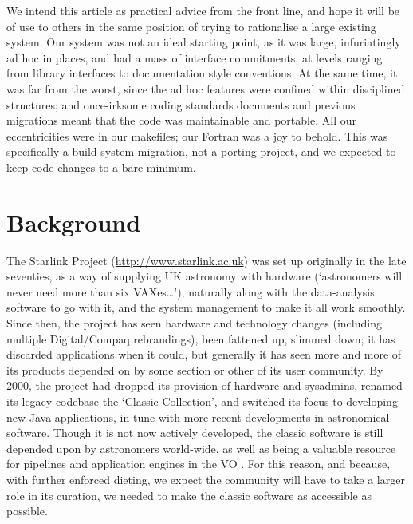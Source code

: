 \documentclass{speauth}
\begin{document}
We intend this article as practical advice from the front line, and
hope it will be of use to others in the same position of trying to
rationalise a large existing system.  Our system was not an ideal
starting point, as it was large, infuriatingly ad hoc in places, and
had a mass of interface commitments, at levels ranging from library
interfaces to documentation style conventions.  At the same time, it
was far from the worst, since the ad hoc features were confined within
disciplined structures; and once-irksome coding standards documents and
previous migrations meant that the code was maintainable and
portable.  All our eccentricities were in our makefiles; our Fortran
was a joy to behold.  This was specifically a build-system migration, not a
porting project, and we expected to keep code changes to a bare minimum.


\section{Background}
\label{s:background}


The Starlink Project (\url{http://www.starlink.ac.uk}) was set up
originally in the late seventies, as a way of supplying UK astronomy
with hardware (`astronomers will never need more than six
VAXes\dots'), naturally along with the data-analysis software to go
with it, and the system management to make it all work smoothly.
Since then, the project has seen hardware and technology changes
(including multiple Digital/Compaq rebrandings), been fattened up,
slimmed down; it has discarded applications when it could, but
generally it has seen more and more of its products depended on by
some section or other of its user community.  By 2000, the project had
dropped its provision of hardware and sysadmins, renamed its legacy
codebase the `Classic Collection', and switched its focus to
developing new Java applications, in tune with more recent
developments in astronomical software.  Though it is not now actively
developed, the classic software is still depended upon by astronomers
world-wide, as well as being a valuable resource for pipelines
\cite{cavanagh03,currie04} and application engines in the VO
\cite{giaretta05}.  For this reason, and because, with further
enforced dieting, we expect the community will have to take a larger
role in its curation, we needed to make the classic software as
accessible as possible.
\end{document}
